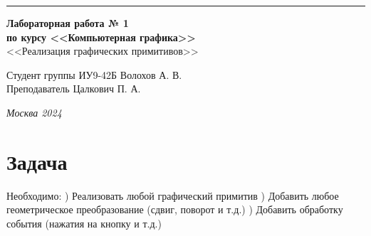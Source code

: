 \documentclass[a4paper, 14pt]{extarticle}
\begin{document}
\begin{titlepage}
\vspace*{-16pt}
\hspace{30pt}\rule{0.866\textwidth}{0.4pt}
  
\vspace{11em}

\begin{center}
\Large {\bf Лабораторная работа № 1} \\ 
\large {\bf по курсу <<Компьютерная графика>>} \\ 
\large <<Реализация графических примитивов>>
\end{center}\normalsize

\vspace{8em}


\begin{flushright}
  {Студент группы ИУ9-42Б Волохов А. В.\hspace*{15pt} \\
  \vspace{2ex}
  Преподаватель Цалкович П. А.\hspace*{15pt}}
\end{flushright}

\bigskip

\vfill
 

\begin{center}
\textsl{Москва 2024}
\end{center}
\end{titlepage}

\renewcommand{\ttdefault}{pcr}

\setlength{\tabcolsep}{3pt}
\newpage
\setcounter{page}{2}

\section{Задача}\label{Sect::task}
\par
Необходимо:
) Реализовать любой графический примитив
) Добавить любое геометрическое преобразование (сдвиг, поворот и т.д.)
) Добавить обработку события (нажатия на кнопку и т.д.)
\end{document}
